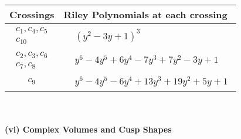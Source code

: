 \documentclass[1p]{elsarticle_modified}
\theoremstyle{definition}
\begin{document}
\begin{tabular}{m{50pt}|m{274pt}}
Crossings & \hspace{64pt}Riley Polynomials at each crossing \\
\hline $$\begin{aligned}c_{1},c_{4},c_{5}\\c_{10}\end{aligned}$$&$\begin{aligned}
&(y^2-3 y+1)^3
\end{aligned}$\\
\hline $$\begin{aligned}c_{2},c_{3},c_{6}\\c_{7},c_{8}\end{aligned}$$&$\begin{aligned}
&y^6-4 y^5+6 y^4-7 y^3+7 y^2-3 y+1
\end{aligned}$\\
\hline $$\begin{aligned}c_{9}\end{aligned}$$&$\begin{aligned}
&y^6-4 y^5-6 y^4+13 y^3+19 y^2+5 y+1
\end{aligned}$\\
\hline
\end{tabular}\\~\\
\newpage\flushleft \textbf{(vi) Complex Volumes and Cusp Shapes}
\end{document}
